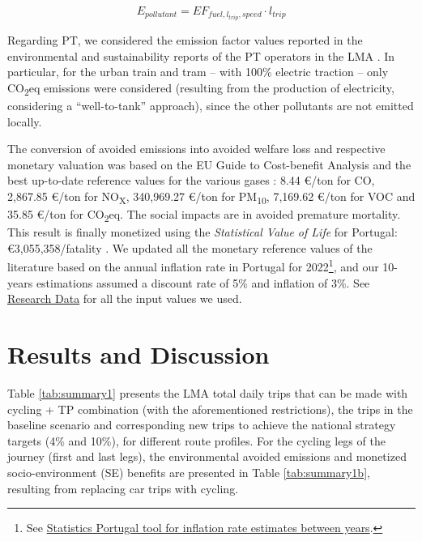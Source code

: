 \documentclass[review, doubleblind, 3p,
authoryear]{elsarticle} %
\begin{document}
\begin{equation}\label{eq:emissaoauto}
{E}_{pollutant} = {EF}_{fuel,l_{trip},speed}\cdot l_{trip}
\end{equation}

Regarding PT, we considered the emission factor values reported in the
environmental and sustainability reports of the PT operators in the LMA
\citep{Carris2019s, Metro2019s, CP2019s, Transtejo2014}. In particular,
for the urban train and tram -- with 100\% electric traction -- only
CO\textsubscript{2}eq emissions were considered (resulting from the
production of electricity, considering a ``well-to-tank'' approach),
since the other pollutants are not emitted locally.

The conversion of avoided emissions into avoided welfare loss and
respective monetary valuation was based on the EU Guide to Cost-benefit
Analysis \citep{EuropeanCommission2014} and the best up-to-date
reference values for the various gases
\citep{EuropeanCommission2014, bickel2006, UNITE}: 8.44 €/ton for CO,
2,867.85 €/ton for NO\textsubscript{X}, 340,969.27 €/ton for
PM\textsubscript{10}, 7,169.62 €/ton for VOC and 35.85 €/ton for
CO\textsubscript{2}eq. The social impacts are in avoided premature
mortality. This result is finally monetized using the \emph{Statistical
Value of Life} for Portugal: €3,055,358/fatality \citep{ANSR2021}. We
updated all the monetary reference values of the literature based on the
annual inflation rate in Portugal for 2022\footnote{See
  \href{https://www.ine.pt/xportal/xmain?xpid=INE&xpgid=ipc}{Statistics
  Portugal tool for inflation rate estimates between years}.}, and our
10-years estimations assumed a discount rate of 5\% and inflation of
3\%. See \hyperref[research-data]{Research Data} for all the input
values we used.

\section{Results and Discussion}\label{results-and-discussion}

Table \ref{tab:summary1} presents the LMA total daily trips that can be
made with cycling + TP combination (with the aforementioned
restrictions), the trips in the baseline scenario and corresponding new
trips to achieve the national strategy targets (4\% and 10\%), for
different route profiles. For the cycling legs of the journey (first and
last legs), the environmental avoided emissions and monetized
socio-environment (SE) benefits are presented in Table
\ref{tab:summary1b}, resulting from replacing car trips with cycling.
\end{document}
